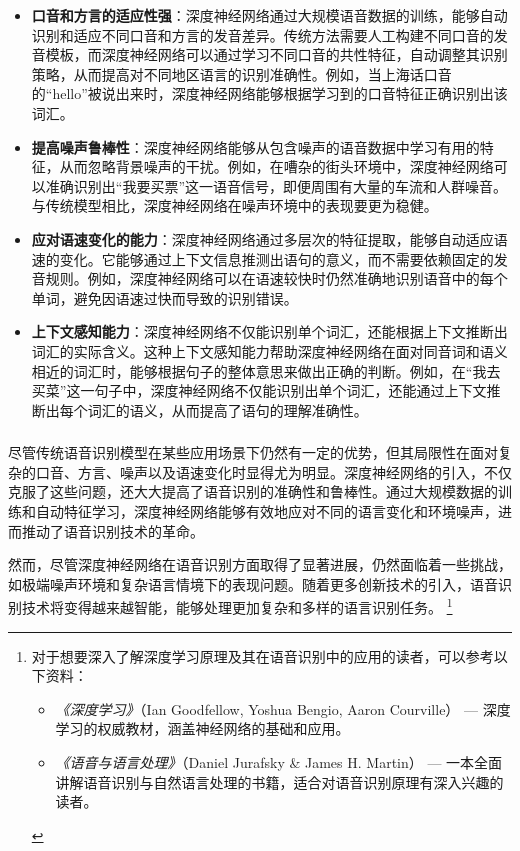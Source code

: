 \begin{itemize}
    \item \textbf{口音和方言的适应性强}：深度神经网络通过大规模语音数据的训练，能够自动识别和适应不同口音和方言的发音差异。传统方法需要人工构建不同口音的发音模板，而深度神经网络可以通过学习不同口音的共性特征，自动调整其识别策略，从而提高对不同地区语言的识别准确性。例如，当上海话口音的“hello”被说出来时，深度神经网络能够根据学习到的口音特征正确识别出该词汇。
    \item \textbf{提高噪声鲁棒性}：深度神经网络能够从包含噪声的语音数据中学习有用的特征，从而忽略背景噪声的干扰。例如，在嘈杂的街头环境中，深度神经网络可以准确识别出“我要买票”这一语音信号，即便周围有大量的车流和人群噪音。与传统模型相比，深度神经网络在噪声环境中的表现要更为稳健。
    \item \textbf{应对语速变化的能力}：深度神经网络通过多层次的特征提取，能够自动适应语速的变化。它能够通过上下文信息推测出语句的意义，而不需要依赖固定的发音规则。例如，深度神经网络可以在语速较快时仍然准确地识别语音中的每个单词，避免因语速过快而导致的识别错误。
    \item \textbf{上下文感知能力}：深度神经网络不仅能识别单个词汇，还能根据上下文推断出词汇的实际含义。这种上下文感知能力帮助深度神经网络在面对同音词和语义相近的词汇时，能够根据句子的整体意思来做出正确的判断。例如，在“我去买菜”这一句子中，深度神经网络不仅能识别出单个词汇，还能通过上下文推断出每个词汇的语义，从而提高了语句的理解准确性。
\end{itemize}

\subsubsection{}

尽管传统语音识别模型在某些应用场景下仍然有一定的优势，但其局限性在面对复杂的口音、方言、噪声以及语速变化时显得尤为明显。深度神经网络的引入，不仅克服了这些问题，还大大提高了语音识别的准确性和鲁棒性。通过大规模数据的训练和自动特征学习，深度神经网络能够有效地应对不同的语言变化和环境噪声，进而推动了语音识别技术的革命。

然而，尽管深度神经网络在语音识别方面取得了显著进展，仍然面临着一些挑战，如极端噪声环境和复杂语言情境下的表现问题。随着更多创新技术的引入，语音识别技术将变得越来越智能，能够处理更加复杂和多样的语言识别任务。
\footnote{
对于想要深入了解深度学习原理及其在语音识别中的应用的读者，可以参考以下资料：
\begin{itemize}
\item \textit{《深度学习》}（Ian Goodfellow, Yoshua Bengio, Aaron Courville） — 深度学习的权威教材，涵盖神经网络的基础和应用。
\item \textit{《语音与语言处理》}（Daniel Jurafsky \& James H. Martin） — 一本全面讲解语音识别与自然语言处理的书籍，适合对语音识别原理有深入兴趣的读者。
\end{itemize}
}


